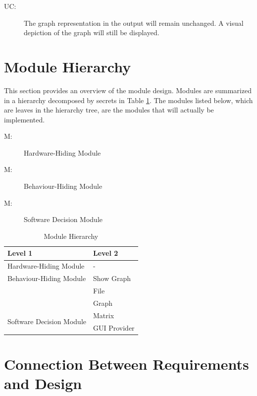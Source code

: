 \documentclass[12pt, titlepage]{article}
\newcounter{ucnum}
\newcommand{\uctheucnum}{UC\theucnum}
\newcounter{mnum}
\newcommand{\mthemnum}{M\themnum}
\begin{document}
\begin{description}
\item[ \uctheucnum \label{measure}:] The graph representation in the output will remain unchanged. A visual depiction of the graph will still be displayed.
\end{description}

\section{Module Hierarchy} \label{SecMH}

This section provides an overview of the module design. Modules are summarized
in a hierarchy decomposed by secrets in Table \ref{TblMH}. The modules listed
below, which are leaves in the hierarchy tree, are the modules that will
actually be implemented.

\begin{description}
\item [ \mthemnum \label{mHH}:] Hardware-Hiding Module
\item [ \mthemnum \label{mHH}:] Behaviour-Hiding Module
\item [ \mthemnum \label{mHH}:] Software Decision Module
\end{description}


\begin{table}[h!]
\centering
\begin{tabular}{p{} p{}}
\toprule
\textbf{Level 1} & \textbf{Level 2}\\
\midrule

{Hardware-Hiding Module} & - \\
\midrule

{Behaviour-Hiding Module} & Show Graph\\ & File\\ & Graph\\
\midrule

\multirow{3}{0.3\textwidth}{Software Decision Module} & Matrix\\ & GUI Provider\\
\bottomrule

\end{tabular}
\caption{Module Hierarchy}
\label{TblMH}
\end{table}

\section{Connection Between Requirements and Design} \label{SecConnection}
\end{document}
